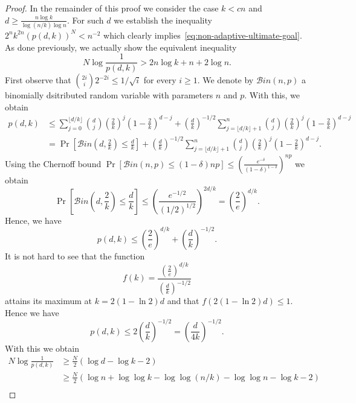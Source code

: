 \documentclass[english,a4paper,11pt]{article}
\newcommand{\comment}[1]{{\bf [#1]}}
\newcommand{\CW}[1]{\comment{\textcolor{blue}{CW: #1}}}
\begin{document}
{\begin{proof}
In the remainder of this proof we consider the case $k<cn$ and $d \ge \frac{n \log k}{\log(n/k) \log n}$. For such $d$ we establish the inequality $2^n k^{2n} (p(d,k))^N < n^{-2}$ which clearly implies~\eqref{eq:non-adaptive-ultimate-goal}. As done previously, we actually show the equivalent inequality
\begin{equation} \label{eq:non-adaptive-case2b}
N \log \frac1{p(d,k)} > 2 n \log k + n + 2 \log n.
\end{equation}
First observe that $\binom{2i}{i} 2^{-2i} \le 1/\sqrt{i}$ for every $i \ge 1$. We denote by $\mathcal Bin(n,p)$ a binomially dsitributed random variable with parameters $n$ and $p$. With this, we obtain 
\begin{align*}
p(d,k) & \le \sum_{j = 0}^{\lfloor d/k \rfloor} \binom dj \left( \frac 2k \right)^j \left( 1 - \frac 2k \right)^{d-j} + \left( \frac dk \right)^{-1/2} \sum_{j = \lfloor d/k \rfloor + 1}^{n} \binom dj \left( \frac 2k \right)^j \left( 1 - \frac 2k \right)^{d-j} \\
& = \Pr \left[ \mathcal Bin \left( d,\frac 2k \right) \le \frac{d}{k} \right] + \left( \frac dk \right)^{-1/2} \sum_{j = \lfloor d/k \rfloor + 1}^{n} \binom dj \left( \frac 2k \right)^j \left( 1 - \frac 2k \right)^{d-j} .
\end{align*}
Using the Chernoff bound $\Pr[ \mathcal Bin(n,p) \le (1 - \delta) np] \le \left( \frac{e^{-\delta}}{(1-\delta)^{1-\delta}}\right)^{np}$ we obtain
\[
\Pr \left[ \mathcal Bin \left( d,\frac 2k \right) \le \frac{d}{k} \right] \le \left( \frac{e^{-1/2}}{\left( 1/2 \right)^{1/2}} \right)^{2d/k} = \left( \frac 2e \right)^{d/k}.
\]
Hence, we have
\[
p(d,k) \le \left( \frac 2e \right)^{d/k} + \left( \frac dk \right)^{-1/2} .
\]
It is not hard to see that the function
\[
f(k) = \frac{\left( \frac2e \right)^{d/k}}{\left( \frac dk \right)^{-1/2}}
\]
attains its maximum at $k = 2(1 - \ln 2)d$ and that $f(2(1-\ln 2)d) \le 1$. Hence we have
\[
p(d,k) \le 2 \left( \frac dk \right)^{-1/2} = \left( \frac{d}{4k} \right)^{-1/2}.
\]
With this we obtain
\begin{align*}
N \log \frac 1{p(d,k)} & \ge \frac N2 ( \log d - \log k - 2) \\
& \ge \frac N2 ( \log n + \log \log k - \log \log (n/k) - \log \log n - \log k - 2) \\

\end{align*}
\end{proof}}
\end{document}

